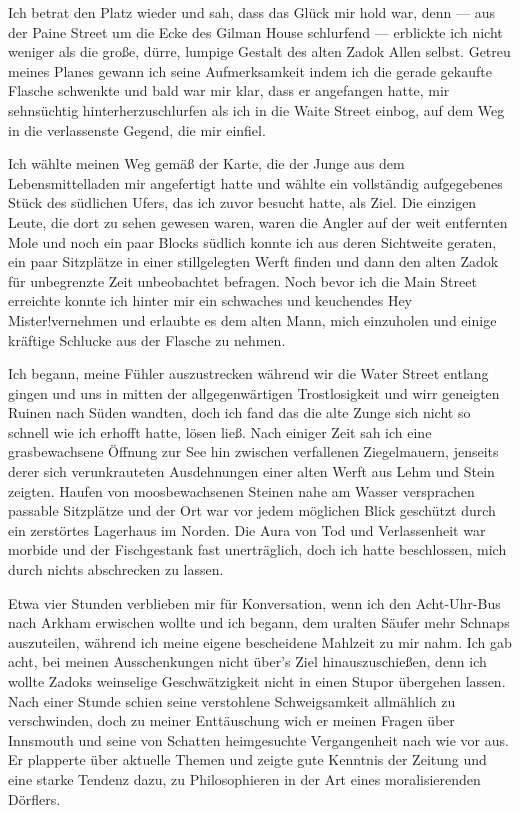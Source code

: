 Ich betrat den Platz wieder und sah, dass das Glück mir hold war, denn --- aus der Paine Street um die Ecke des Gilman House schlurfend --- erblickte ich nicht weniger als die große, dürre, lumpige Gestalt des alten Zadok Allen selbst. Getreu meines Planes gewann ich seine Aufmerksamkeit indem ich die gerade gekaufte Flasche schwenkte und bald war mir klar, dass er angefangen hatte, mir sehnsüchtig hinterherzuschlurfen als ich in die Waite Street einbog, auf dem Weg in die verlassenste Gegend, die mir einfiel.

Ich wählte meinen Weg gemäß der Karte, die der Junge aus dem Lebensmittelladen mir angefertigt hatte und wählte ein vollständig aufgegebenes Stück des südlichen Ufers, das ich zuvor besucht hatte, als Ziel. Die einzigen Leute, die dort zu sehen gewesen waren, waren die Angler auf der weit entfernten Mole und noch ein paar Blocks südlich konnte ich aus deren Sichtweite geraten, ein paar Sitzplätze in einer stillgelegten Werft finden und dann den alten Zadok für unbegrenzte Zeit unbeobachtet befragen. Noch bevor ich die Main Street erreichte konnte ich hinter mir ein schwaches und keuchendes \glqq Hey Mister!\grqq vernehmen und erlaubte es dem alten Mann, mich einzuholen und einige kräftige Schlucke aus der Flasche zu nehmen.

Ich begann, meine Fühler auszustrecken während wir die Water Street entlang gingen und uns in mitten der allgegenwärtigen Trostlosigkeit und wirr geneigten Ruinen nach Süden wandten, doch ich fand das die alte Zunge sich nicht so schnell wie ich erhofft hatte, lösen ließ. Nach einiger Zeit sah ich eine grasbewachsene Öffnung zur See hin zwischen verfallenen Ziegelmauern, jenseits derer sich verunkrauteten Ausdehnungen einer alten Werft aus Lehm und Stein zeigten. Haufen von moosbewachsenen Steinen nahe am Wasser versprachen passable Sitzplätze und der Ort war vor jedem möglichen Blick geschützt durch ein zerstörtes Lagerhaus im Norden. Die Aura von Tod und Verlassenheit war morbide und der Fischgestank fast unerträglich, doch ich hatte beschlossen, mich durch nichts abschrecken zu lassen.

Etwa vier Stunden verblieben mir für Konversation, wenn ich den Acht-Uhr-Bus nach Arkham erwischen wollte und ich begann, dem uralten Säufer mehr Schnaps auszuteilen, während ich meine eigene bescheidene Mahlzeit zu mir nahm. Ich gab acht, bei meinen Ausschenkungen nicht über's Ziel hinauszuschießen, denn ich wollte Zadoks weinselige Geschwätzigkeit nicht in einen Stupor übergehen lassen. Nach einer Stunde schien seine verstohlene Schweigsamkeit allmählich zu verschwinden, doch zu meiner Enttäuschung wich er meinen Fragen über Innsmouth und seine von Schatten heimgesuchte Vergangenheit nach wie vor aus. Er plapperte über aktuelle Themen und zeigte gute Kenntnis der Zeitung und eine starke Tendenz dazu, zu Philosophieren in der Art eines moralisierenden Dörflers.


